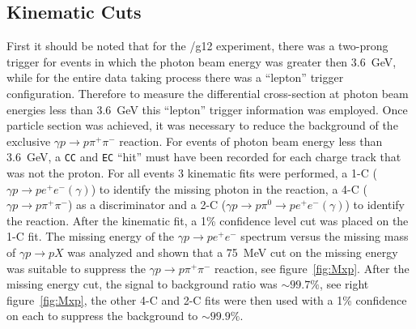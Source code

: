 \documentclass{aip-cp}
\newcommand{\abbr}[1]{\textsc{\texttt{#1}}}
\begin{document}
\subsection{Kinematic Cuts}
First it should be noted that for the /g12 experiment, there was a two-prong trigger for events in which the photon beam energy was greater then 3.6~GeV, while for the entire data taking process there was a ``lepton'' trigger configuration. Therefore to measure the differential cross-section at photon beam energies less than 3.6~GeV this ``lepton'' trigger information was employed. 
Once particle section was achieved, it was necessary to reduce the background of the exclusive $\gamma p \to p \pi^{+}\pi^{-}$ reaction. For events of photon beam energy less than 3.6~GeV, a \abbr{CC} and \abbr{EC} ``hit'' must have been recorded for each charge track that was not the proton. For all events 3 kinematic fits were performed, a 1-C ( $\gamma p \to p e^{+}e^{-}(\gamma)$) to identify the missing photon in the reaction, a 4-C ($\gamma p \to p \pi^{+}\pi^{-}$) as a discriminator and a 2-C ($\gamma p \to p \pi^0 \to pe^{+}e^{-}(\gamma)$) to identify the reaction. After the kinematic fit, a 1\% confidence level cut was placed on the 1-C fit. The missing energy of the $\gamma p \to p e^{+}e^{-}$ spectrum versus the missing mass of $\gamma p \to p X$ was analyzed and shown that a 75~MeV cut on the missing energy was suitable to suppress the $\gamma p \to p \pi^{+}\pi^{-}$ reaction, see figure~\ref{fig:Mxp}. After the missing energy cut, the signal to background ratio was $\sim 99.7\%$, see right figure~\ref{fig:Mxp}, the other 4-C and 2-C fits were then used with a 1\% confidence on each to suppress the background to $\sim 99.9\%$.
\end{document}
